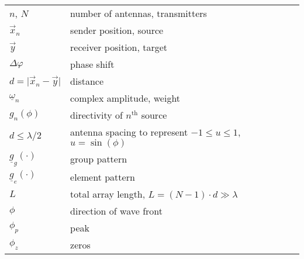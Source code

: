 \documentclass[
	final,
	a4paper,
	oneside,
	parskip=full,
	headings=standardclasses,
	headings=big,
	pointednumbers
]{scrartcl}
\begin{document}
    \begin{tabular}{p{2.8cm}p{10cm}}
        $n$, $N$                                & number of antennas, transmitters \\
        $\vec{x}_n$                             & sender position, source \\
        $\vec{y}$                               & receiver position, target \\
        $\Delta\varphi$                         & phase shift \\
        $d = \vert \vec{x}_n - \vec{y} \vert$   & distance \\
        $\underline{\omega}_n$                  & complex amplitude, weight \\
        $g_n\left(\phi\right)$                  & directivity of $n^{\text{th}}$ source \\
        $ d \leqslant \lambda/2$                & antenna spacing to represent $-1 \leqslant u \leqslant 1$,
                                                  $u = \sin\left(\phi\right)$ \\
        $ \underline{g}_g\left(\cdot\right)$    & group pattern \\
        $ \underline{g}_e\left(\cdot\right)$    & element pattern \\
        $ L$                                    & total array length, $ L = \left(N - 1\right) \cdot d \gg \lambda $ \\
        $ \phi$                                 & direction of wave front \\
        $ \phi_p$                               & peak \\
        $ \phi_z$                               & zeros
    \end{tabular} \\

    
    
\end{document}
